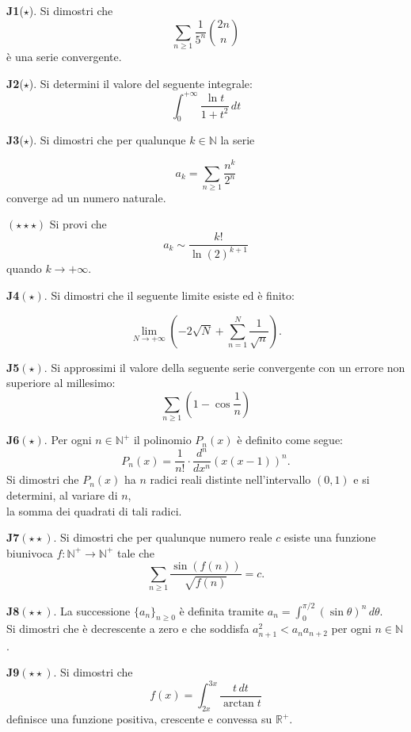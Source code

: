 \documentclass[a4paper,twoside]{article}
\theoremstyle{definition}
\numberwithin{theorem}{section}
\begin{document}
 \textbf{J1}($\star$). Si dimostri che 
\begin{equation*}
 \sum_{n\geq 1}\frac{1}{5^n}\binom{2n}{n}   
\end{equation*}
è una serie convergente.


\textbf{J2}($\star$). Si determini il valore del seguente integrale: 
\begin{equation*}
 \int_{0}^{+\infty}\frac{\ln t}{1+t^2}\,dt   
\end{equation*}


\textbf{J3}($\star$). Si dimostri che per qualunque $k\in\mathbb{N}$ la serie

 \begin{equation*}
    a_k = \sum_{n\geq 1}\frac{n^k}{2^n} 
 \end{equation*}
converge ad un numero naturale.  \par
$(\star\star\star)$ Si provi che 
\begin{equation*}
    a_k\sim \frac{k!}{\ln(2)^{k+1}}
\end{equation*} quando $k\to +\infty$.


\textbf{J4}$(\star)$. Si dimostri che il seguente limite esiste ed è finito:

$$ \lim_{N\to +\infty}\left(-2\sqrt{N}+\sum_{n=1}^{N}\frac{1}{\sqrt{n}}\right).$$

\textbf{J5}$(\star)$. Si approssimi il valore della seguente serie convergente con un errore non superiore al millesimo:
$$ \sum_{n\geq 1}\left(1-\cos\frac{1}{n}\right)$$

\textbf{J6}$(\star)$. Per ogni $n\in\mathbb{N}^+$ il polinomio $P_n(x)$ è definito come segue:
$$ P_n(x) = \frac{1}{n!}\cdot\frac{d^n}{dx^n}\left(x(x-1)\right)^n.$$
Si dimostri che $P_n(x)$ ha $n$ radici reali distinte nell'intervallo $(0,1)$ e si determini, al variare di $n$,\\ la somma dei quadrati di tali radici.

\textbf{J7}$(\star\star)$. Si dimostri che per qualunque numero reale $c$ esiste una funzione biunivoca $f:\mathbb{N}^+\to\mathbb{N}^+$ tale che 
$$ \sum_{n\geq 1}\frac{\sin(f(n))}{\sqrt{f(n)}} = c.$$

\textbf{J8}$(\star\star)$. La successione $\{a_n\}_{n\geq 0}$ è definita tramite $a_n=\int_{0}^{\pi/2}\left(\sin\theta\right)^n\,d\theta$.\\ Si dimostri che è decrescente a zero e che soddisfa $a_{n+1}^2 < a_n a_{n+2}$ per ogni $n\in\mathbb{N}$.

\textbf{J9}$(\star\star)$. Si dimostri che 
$$ f(x) = \int_{2x}^{3x}\frac{t\,dt}{\arctan t} $$
definisce una funzione positiva, crescente e convessa su $\mathbb{R^+}$. \\
\end{document}
